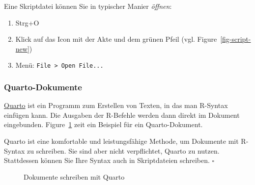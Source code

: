 \documentclass[
  letterpaper,
  DIV=11,
  numbers=noendperiod]{scrartcl}
\providecommand{\tightlist}{%
  \setlength{\itemsep}{0pt}\setlength{\parskip}{0pt}}\usepackage{longtable,booktabs,array}
\theoremstyle{definition}
\theoremstyle{definition}
\theoremstyle{definition}
\theoremstyle{remark}
\begin{document}
Eine Skriptdatei können Sie in typischer Manier \emph{öffnen}:

\begin{enumerate}
\def\labelenumi{\arabic{enumi}.}
\tightlist
\item
  Strg+O
\item
  Klick auf das Icon mit der Akte und dem grünen Pfeil (vgl.
  Figure~\ref{fig-script-new})
\item
  Menü: \texttt{File\ \textgreater{}\ Open\ File...}
\end{enumerate}

\subsubsection{Quarto-Dokumente}\label{quarto-dokumente}

\href{https://quarto.org/}{Quarto} ist ein Programm zum Erstellen von
Texten, in das man R-Syntax einfügen kann. Die Ausgaben der R-Befehle
werden dann direkt im Dokument eingebunden. Figure~\ref{fig-exm-quarto}
zeit ein Beispiel für ein Quarto-Dokument.

\begin{tcolorbox}[enhanced jigsaw, coltitle=black, colframe=quarto-callout-note-color-frame, opacityback=0, toprule=.15mm, opacitybacktitle=0.6, arc=.35mm, titlerule=0mm, toptitle=1mm, title=\textcolor{quarto-callout-note-color}{\faInfo}\hspace{0.5em}{Note}, bottomtitle=1mm, leftrule=.75mm, breakable, rightrule=.15mm, colbacktitle=quarto-callout-note-color!10!white, bottomrule=.15mm, colback=white, left=2mm]

Quarto ist eine komfortable und leistungsfähige Methode, um Dokumente
mit R-Syntax zu schreiben. Sie sind aber nicht verpflichtet, Quarto zu
nutzen. Stattdessen können Sie Ihre Syntax auch in Skriptdateien
schreiben. \(\square\)

\end{tcolorbox}

\begin{figure}


\caption{\label{fig-exm-quarto}Dokumente schreiben mit Quarto}

\end{figure}%
\end{document}
